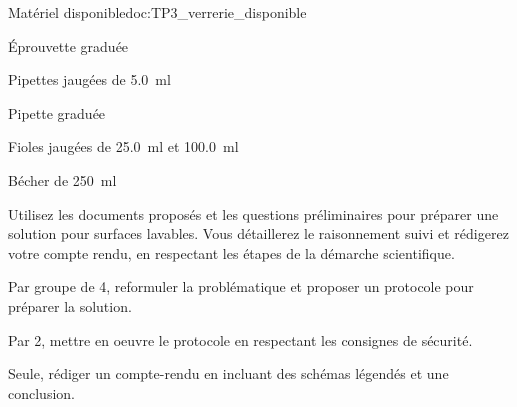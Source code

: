 \begin{doc}{Matériel disponible}{doc:TP3_verrerie_disponible}
  \begin{multicols}{2}
    \begin{listePoints}
      \item Éprouvette graduée
      \item Pipettes jaugées de \qty{5,0}{\ml}
      \item Pipette graduée
      \item Fioles jaugées de \qty{25,0}{\ml} et \qty{100,0}{\ml}
      \item Bécher de \qty{250}{\ml}
    \end{listePoints}
  \end{multicols}
\end{doc}

\vspace*{-8pt}






\mesure
Utilisez les documents proposés et les questions préliminaires pour préparer une solution pour surfaces lavables.
Vous détaillerez le raisonnement suivi et rédigerez votre compte rendu, en respectant les étapes de la démarche scientifique.
\begin{protocole}
  \item Par groupe de 4, reformuler la problématique et proposer un protocole pour préparer la solution.
  \item Par 2, mettre en oeuvre le protocole en respectant les consignes de sécurité.
  \item Seule, rédiger un compte-rendu en incluant des schémas légendés et une conclusion.
\end{protocole}